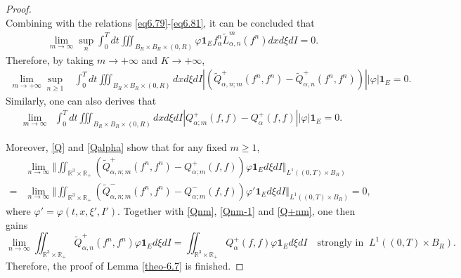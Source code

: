 \documentclass[reqno,11pt]{amsart}
\numberwithin{equation}{section}
\def\R{\mathbb{R}}
\begin{document}
\begin{proof}
\begin{equation}
	\end{equation}
	Combining with the relations \eqref{eq6.79}-\eqref{eq6.81}, it can be concluded that
	\begin{equation*}
		\begin{aligned}
			\lim \limits_{m\rightarrow \infty} \sup \limits_{n} \int_{0}^{T} dt \iiint_{B_R \times B_R \times(0,R)} \varphi \mathbf{1}_E f^n_\alpha \tilde{L}^m_{\alpha ,n} (f^n) dxd\xi dI = 0.
		\end{aligned}
	\end{equation*}
	Therefore, by taking $m \to + \infty$ and $K \to + \infty$,
	\begin{equation}\label{Qnm}
		\begin{aligned}
			\lim \limits_{m\rightarrow + \infty} \sup \limits_{n \geq 1}&\int_{0}^{T}dt \iiint_{B_R \times B_R \times(0,R)} dxd\xi dI |(\tilde{Q}^{ +}_{\alpha ,n;m}(f^n,f^n) -\tilde{Q}^+_{\alpha,n} (f^n,f^n) )| |\varphi| \mathbf{1}_E = 0.
		\end{aligned}
	\end{equation}
Similarly, one can also derives that
\begin{equation}\label{Qnm-1}
  \begin{aligned}
    \lim \limits_{m\rightarrow \infty}&\int_{0}^{T}dt \iiint_{B_R \times B_R \times(0,R)} dxd\xi dI |Q^{+}_{\alpha ;m }(f,f) -Q^+_{\alpha} (f,f) | |\varphi| \mathbf{1}_E = 0.
  \end{aligned}
\end{equation}


Moreover, \eqref{Q} and \eqref{Qalpha} show that for any fixed $m\geq 1$,
	\begin{equation}\label{Q+nm}
		\begin{aligned}
			&\lim \limits_{n\rightarrow \infty}\Vert \iint_{\R^3 \times \R_+} (\tilde{Q}^+_{\alpha ,n ;m}(f^n,f^n)-Q^+_{\alpha;m } (f,f))  \varphi \mathbf{1}_E d\xi dI \Vert_{L^1((0,T) \times B_R)}\\
			=&\lim \limits_{n\rightarrow \infty}\Vert \iint_{\R^3 \times \R_+} (\tilde{Q}^-_{\alpha ,n;m}(f^n,f^n)-Q^-_{\alpha;m } (f,f))  \varphi' \mathbf{1}_E d\xi dI \Vert_{L^1((0,T) \times B_R)}=0,
		\end{aligned}
	\end{equation}
where $\varphi ' = \varphi (t,x,\xi ' ,I')$. Together with \eqref{Qnm}, \eqref{Qnm-1} and \eqref{Q+nm}, one then gains
	\begin{equation*}
		\lim \limits_{n\rightarrow \infty } \iint_{ \R^3 \times \R_+} \tilde{Q}^+_{\alpha ,n} (f^n,f^n) \varphi \mathbf{1}_E d\xi dI =  \iint_{ \R^3 \times \R_+} Q^+_{\alpha } (f,f) \varphi \mathbf{1}_E d\xi dI \quad \text{strongly in } \ L^1 ((0,T)\times B_R).
	\end{equation*}
	Therefore, the proof of Lemma \ref{theo-6.7} is finished.
\end{proof}
\end{document}

